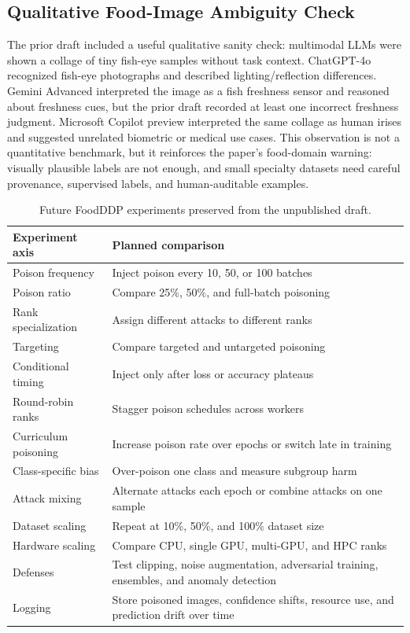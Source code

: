 ﻿\documentclass[6p,10pt,times]{ieeeaccess}
\begin{document}
\subsection{Qualitative Food-Image Ambiguity Check}

The prior draft included a useful qualitative sanity check: multimodal LLMs were shown a collage of tiny fish-eye samples without task context. ChatGPT-4o recognized fish-eye photographs and described lighting/reflection differences. Gemini Advanced interpreted the image as a fish freshness sensor and reasoned about freshness cues, but the prior draft recorded at least one incorrect freshness judgment. Microsoft Copilot preview interpreted the same collage as human irises and suggested unrelated biometric or medical use cases. This observation is not a quantitative benchmark, but it reinforces the paper's food-domain warning: visually plausible labels are not enough, and small specialty datasets need careful provenance, supervised labels, and human-auditable examples.

\begin{table}[t]
\centering
\caption{Future FoodDDP experiments preserved from the unpublished draft.}
\label{tab:futurefoodddp}
\small
\begin{tabular}{p{}p{}}
\toprule
Experiment axis & Planned comparison \\
\midrule
Poison frequency & Inject poison every 10, 50, or 100 batches \\
Poison ratio & Compare 25\%, 50\%, and full-batch poisoning \\
Rank specialization & Assign different attacks to different ranks \\
Targeting & Compare targeted and untargeted poisoning \\
Conditional timing & Inject only after loss or accuracy plateaus \\
Round-robin ranks & Stagger poison schedules across workers \\
Curriculum poisoning & Increase poison rate over epochs or switch late in training \\
Class-specific bias & Over-poison one class and measure subgroup harm \\
Attack mixing & Alternate attacks each epoch or combine attacks on one sample \\
Dataset scaling & Repeat at 10\%, 50\%, and 100\% dataset size \\
Hardware scaling & Compare CPU, single GPU, multi-GPU, and HPC ranks \\
Defenses & Test clipping, noise augmentation, adversarial training, ensembles, and anomaly detection \\
Logging & Store poisoned images, confidence shifts, resource use, and prediction drift over time \\
\bottomrule
\end{tabular}
\end{table}
\end{document}
